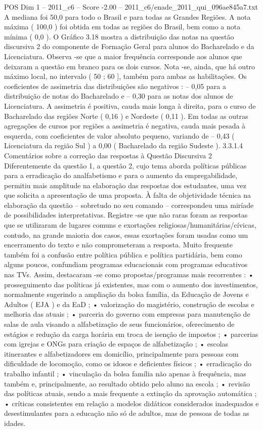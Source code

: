 \begin{textsample}{POS Dim 1 – 2011\_c6 – Score -2.00 – 2011\_c6/enade\_2011\_qui\_096ae845a7.txt}
A mediana foi 50,0 para todo o Brasil e para todas as Grandes Regiões.
A nota máxima ( 100,0 ) foi obtida em todas as regiões do Brasil, bem como a nota mínima ( 0,0 ).
O Gráfico 3.18 mostra a distribuição das notas na questão discursiva 2 do componente de Formação Geral para alunos do Bacharelado e da Licenciatura.
Observa -se que a maior frequência corresponde aos alunos que deixaram a questão em branco para os dois cursos.
Nota -se, ainda, que há outro máximo local, no intervalo ( 50 ; 60 ], também para ambas as habilitações.
Os coeficientes de assimetria das distribuições são negativos : – 0,05 para a distribuição de notas do Bacharelado e – 0,30 para as notas dos alunos de Licenciatura.
A assimetria é positiva, cauda mais longa à direita, para o curso de Bacharelado das regiões Norte ( 0,16 ) e Nordeste ( 0,11 ).
Em todas as outras agregações de cursos por regiões a assimetria é negativa, cauda mais pesada à esquerda, com coeficientes de valor absoluto pequeno, variando de – 0,43 ( Licenciatura da região Sul ) a 0,00 ( Bacharelado da região Sudeste ). 3.3.1.4 Comentários sobre a correção das respostas à Questão Discursiva 2 Diferentemente da questão 1, a questão 2, cujo tema aborda políticas públicas para a erradicação do analfabetismo e para o aumento da empregabilidade, permitiu mais amplitude na elaboração das respostas dos estudantes, uma vez que solicita a apresentação de uma proposta.
À falta de objetividade técnica na elaboração da questão – sobretudo no seu comando – correspondeu uma miríade de possibilidades interpretativas.
Registre -se que não raras foram as respostas que se utilizaram de lugares comuns e exortações religiosas/humanitárias/cívicas, contudo, na grande maioria dos casos, essas exortações foram usadas como um encerramento do texto e não comprometeram a resposta.
Muito frequente também foi a confusão entre política pública e política partidária, bem como alguns poucos, confundiam programas educacionais com programas educativos nas TVs.
Assim, destacaram -se como propostas/programas mais recorrentes : • prosseguimento das políticas já existentes, mas com o aumento dos investimentos, normalmente sugerindo a ampliação da bolsa família, da Educação de Jovens e Adultos ( EJA ) e da EaD ; • valorização do magistério, construção de escolas e melhoria das atuais ; • parceria do governo com empresas para manutenção de salas de aula visando a alfabetização de seus funcionários, oferecimento de estágios e redução da carga horária em troca de isenção de impostos ; • parcerias com igrejas e ONGs para criação de espaços de alfabetização ; • escolas itinerantes e alfabetizadores em domicílio, principalmente para pessoas com dificuldade de locomoção, como os idosos e deficientes físicos ; • erradicação do trabalho infantil ; • vinculação da bolsa família não apenas à frequência, mas também e, principalmente, ao resultado obtido pelo aluno na escola ; • revisão das políticas atuais, sendo a mais frequente a extinção da aprovação automática ; • críticas consistentes em relação a modelos didáticos considerados inadequados e desestimulantes para a educação não só de adultos, mas de pessoas de todas as idades.

\end{textsample}
